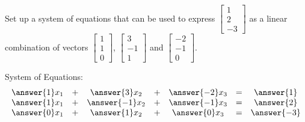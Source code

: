 \documentclass{ximera}
\begin{document}
\begin{problem}
Set up a system of equations that can be used to express $\begin{bmatrix}1\\2\\-3\end{bmatrix}$ as a linear combination of vectors $\begin{bmatrix}1\\1\\0\end{bmatrix}$, $\begin{bmatrix}3\\-1\\1\end{bmatrix}$ and $\begin{bmatrix}-2\\-1\\0\end{bmatrix}$.

System of Equations:
$$\begin{array}{ccccccc}
      \answer{1}x_1 & +&\answer{3}x_2&+&\answer{-2}x_3&= &\answer{1} \\
	 \answer{1}x_1& +&\answer{-1}x_2&+&\answer{-1}x_3&=&\answer{2}\\
     \answer{0}x_1& +&\answer{1}x_2&+&\answer{0}x_3&=&\answer{-3}
    \end{array}$$
\end{problem}
\end{document}

